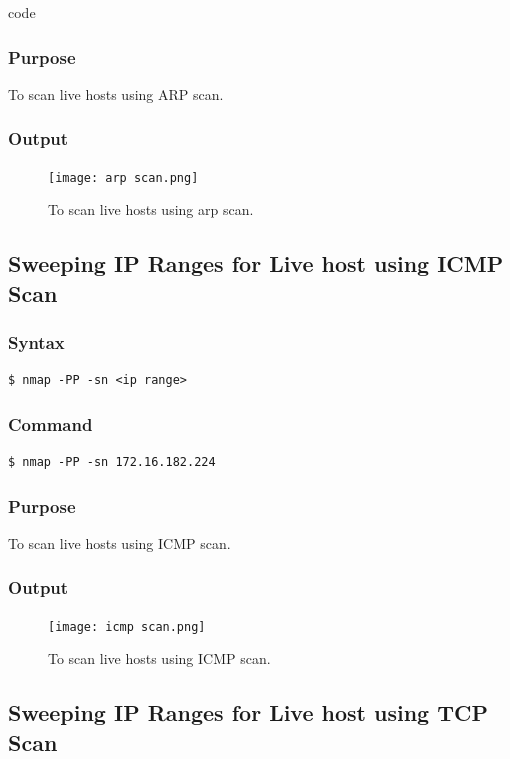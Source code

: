 code \documentclass[11pt]{article}
\begin{document}
\subsubsection*{Purpose}
To scan live hosts using ARP scan.

\subsubsection*{Output}
\begin{figure}[H]
    \centering
    \texttt{[image: arp scan.png]}
    \caption{To scan live hosts using arp scan.}
    \label{fig:1}
\end{figure}


\subsection{Sweeping IP Ranges for Live host using ICMP Scan}

\subsubsection{Syntax}
\begin{verbatim}
$ nmap -PP -sn <ip range>
\end{verbatim}

\subsubsection*{Command}
\begin{verbatim}
$ nmap -PP -sn 172.16.182.224
\end{verbatim}

\subsubsection*{Purpose}
To scan live hosts using ICMP scan.

\subsubsection*{Output}
\begin{figure}[H]
    \centering
    \texttt{[image: icmp scan.png]}
    \caption{To scan live hosts using ICMP scan.}
    \label{fig:1}
\end{figure}

\subsection{Sweeping IP Ranges for Live host using TCP Scan}
\end{document}
